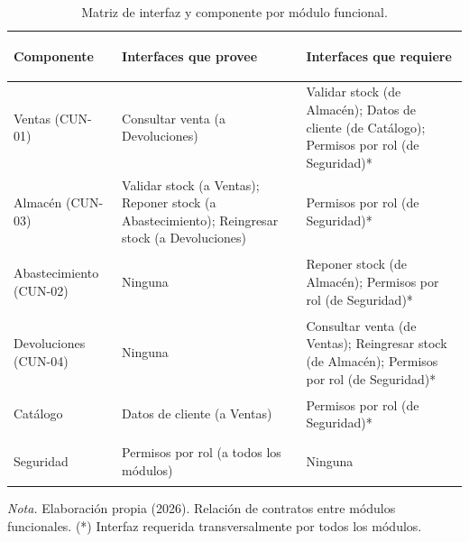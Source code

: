 \begin{table}[H]
  \centering
  \caption{Matriz de interfaz y componente por módulo funcional.}
  \label{tab:matriz_componentes_modulos}
  \begin{tabularx}{\textwidth}{|>{\bfseries\raggedright\arraybackslash}p{3.2cm}|>{\raggedright\arraybackslash}X|>{\raggedright\arraybackslash}X|}
    \hline
    \textbf{Componente} & \textbf{Interfaces que provee} & \textbf{Interfaces que requiere} \\ \hline
    Ventas (CUN-01) & Consultar venta (a Devoluciones) & Validar stock (de Almacén); Datos de cliente (de Catálogo); Permisos por rol (de Seguridad)* \\ \hline
    Almacén (CUN-03) & Validar stock (a Ventas); Reponer stock (a Abastecimiento); Reingresar stock (a Devoluciones) & Permisos por rol (de Seguridad)* \\ \hline
    Abastecimiento (CUN-02) & Ninguna & Reponer stock (de Almacén); Permisos por rol (de Seguridad)* \\ \hline
    Devoluciones (CUN-04) & Ninguna & Consultar venta (de Ventas); Reingresar stock (de Almacén); Permisos por rol (de Seguridad)* \\ \hline
    Catálogo & Datos de cliente (a Ventas) & Permisos por rol (de Seguridad)* \\ \hline
    Seguridad & Permisos por rol (a todos los módulos) & Ninguna \\ \hline
  \end{tabularx}
  \par\vspace{0.2cm}
  {\raggedright \small \emph{Nota.} Elaboración propia (2026). Relación de contratos entre módulos funcionales. (*) Interfaz requerida transversalmente por todos los módulos.\par}
\end{table}
